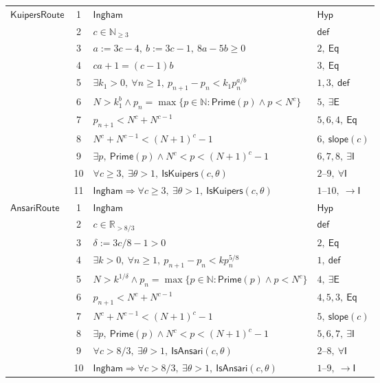 \documentclass[11pt,reqno]{amsart}
\newcommand{\Ingham}{\mathsf{Ingham}}
\theoremstyle{blueplain}
\numberwithin{equation}{section}
\begin{document}
{\begin{longtable}{|p{3cm}|c|p{10cm}|p{4cm}|}
	\multirow{11}{*}{$\mathsf{KuipersRoute}$} &
	1 & $\Ingham$ & $\mathsf{Hyp}$\\
	\cline{2-4}
	& 2 & $c\in\mathbb{N}_{\ge 3}$ & $\mathsf{def}$\\
	\cline{2-4}
	& 3 & $a:=3c-4,\ b:=3c-1,\ 8a-5b\ge 0$ & $2,\ \mathsf{Eq}$\\
	\cline{2-4}
	& 4 & $ca+1=(c-1)b$ & $3,\ \mathsf{Eq}$\\
	\cline{2-4}
	& 5 & $\exists k_1>0,\ \forall n\ge1,\ p_{n+1}-p_n<k_1p_n^{a/b}$ & $1,3,\ \mathsf{def}$\\
	\cline{2-4}
	& 6 & $N>k_1^{b}\wedge p_n=\max\{p\in\mathbb{N}:\mathsf{Prime}(p)\wedge p<N^c\}$ & $5,\ \exists\mathsf{E}$\\
	\cline{2-4}
	& 7 & $p_{n+1}<N^c+N^{c-1}$ & $5,6,4,\ \mathsf{Eq}$\\
	\cline{2-4}
	& 8 & $N^c+N^{c-1}<(N+1)^c-1$ & $6,\ \mathsf{slope}(c)$\\
	\cline{2-4}
	& 9 & $\exists p,\ \mathsf{Prime}(p)\wedge N^c<p<(N+1)^c-1$ & $6,7,8,\ \exists\mathsf{I}$\\
	\cline{2-4}
	& 10 & $\forall c\ge3,\ \exists\theta>1,\ \mathsf{IsKuipers}(c,\theta)$ & $2\text{--}9,\ \forall\mathsf{I}$\\
	\cline{2-4}
	& 11 & $\Ingham\Rightarrow\forall c\ge3,\ \exists\theta>1,\ \mathsf{IsKuipers}(c,\theta)$ & $1\text{--}10,\ \rightarrow\mathsf{I}$\\
	\hline
	
	\multirow{10}{*}{$\mathsf{AnsariRoute}$} &
	1 & $\Ingham$ & $\mathsf{Hyp}$\\
	\cline{2-4}
	& 2 & $c\in\mathbb{R}_{>8/3}$ & $\mathsf{def}$\\
	\cline{2-4}
	& 3 & $\delta:=3c/8-1>0$ & $2,\ \mathsf{Eq}$\\
	\cline{2-4}
	& 4 & $\exists k>0,\ \forall n\ge1,\ p_{n+1}-p_n<kp_n^{5/8}$ & $1,\ \mathsf{def}$\\
	\cline{2-4}
	& 5 & $N>k^{1/\delta}\wedge p_n=\max\{p\in\mathbb{N}:\mathsf{Prime}(p)\wedge p<N^c\}$ & $4,\ \exists\mathsf{E}$\\
	\cline{2-4}
	& 6 & $p_{n+1}<N^c+N^{c-1}$ & $4,5,3,\ \mathsf{Eq}$\\
	\cline{2-4}
	& 7 & $N^c+N^{c-1}<(N+1)^c-1$ & $5,\ \mathsf{slope}(c)$\\
	\cline{2-4}
	& 8 & $\exists p,\ \mathsf{Prime}(p)\wedge N^c<p<(N+1)^c-1$ & $5,6,7,\ \exists\mathsf{I}$\\
	\cline{2-4}
	& 9 & $\forall c>8/3,\ \exists\theta>1,\ \mathsf{IsAnsari}(c,\theta)$ & $2\text{--}8,\ \forall\mathsf{I}$\\
	\cline{2-4}
	& 10 & $\Ingham\Rightarrow\forall c>8/3,\ \exists\theta>1,\ \mathsf{IsAnsari}(c,\theta)$ & $1\text{--}9,\ \rightarrow\mathsf{I}$\\
	\hline
	

\end{longtable}}
\end{document}
